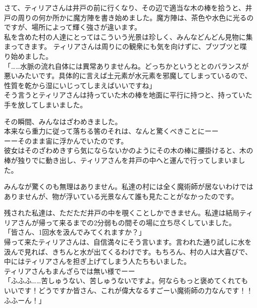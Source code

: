 \documentclass[oneside, a4paper]{jsbook}
\begin{document}
さて、ティリアさんは井戸の前に行くなり、その辺で適当な木の棒を拾うと、井戸の周りの何か所かに魔方陣を書き始めました。魔方陣は、茶色や水色に光るのですが、場所によって輝く強さが違います。\\
私を含めた村の人達にとってはこういう光景は珍しく、みんなどんどん見物に集まってきます。
ティリアさんは周りにの観衆にも気を向けずに、ブツブツと喋り始めました。\\
  
 「……水脈の流れ自体には異常ありませんね。どっちかというととのバランスが悪いみたいです。具体的に言えば土元素が水元素を邪魔してしまっているので、性質を乾から湿にいじってしまえばいいですね」\\

そう言うとティリアさんは持っていた木の棒を地面に平行に持つと、持っていた手を放してしまいました。

その瞬間、みんなはざわめきました。\\
本来なら重力に従って落ちる筈のそれは、なんと驚くべきことにーー\\

ーーそのまま宙に浮かんでいたのです。\\

彼女はそのざわめきすら気にならないかのようにその木の棒に腰掛けると、木の棒が独りでに動き出し、ティリアさんを井戸の中へと運んで行ってしまいました。

みんなが驚くのも無理はありません。私達の村には全く魔術師が居ないわけではありませんが、物が浮いている光景なんて誰も見たことがなかったのです。

残された私達は、ただただ井戸の中を覗くことしかできません。私達は結局ティリアさんが帰って来るまでの2分弱もの間その場に立ち尽くしていました。\\

\noindent
「皆さん、1回水を汲んでみてくれますか？」\\

\noindent
帰って来たティリアさんは、自信満々にそう言います。言われた通り試しに水を汲んで見れば、きちんと水が出てくるわけです。もちろん、村の人は大喜びで、中にはティリアさんを担ぎ上げてしまう人たちもいました。\\

ティリアさんもまんざらでは無い様でーー\\

\noindent
「ふふふ……苦しゅうない、苦しゅうないですよ。何ならもっと褒めてくれてもいいです！どうですか皆さん、これが偉大なるすごーい魔術師の力なんです！！ふふーん！」\\
\end{document}
